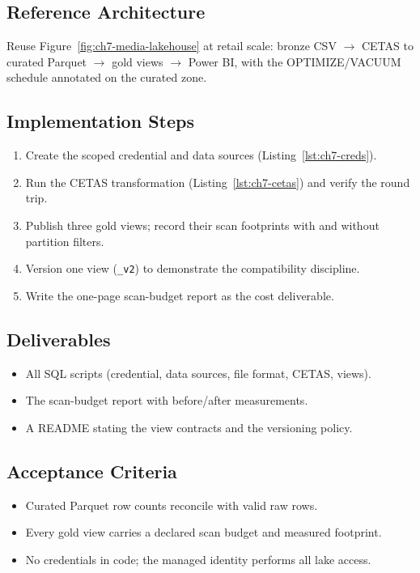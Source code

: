 \subsection*{Reference Architecture}
Reuse Figure~\ref{fig:ch7-media-lakehouse} at retail scale: bronze CSV $\rightarrow$ CETAS to curated Parquet $\rightarrow$ gold views $\rightarrow$ Power BI, with the OPTIMIZE/VACUUM schedule annotated on the curated zone.

\subsection*{Implementation Steps}
\begin{enumerate}
    \item Create the scoped credential and data sources (Listing~\ref{lst:ch7-creds}).
    \item Run the CETAS transformation (Listing~\ref{lst:ch7-cetas}) and verify the round trip.
    \item Publish three gold views; record their scan footprints with and without partition filters.
    \item Version one view (\texttt{\_v2}) to demonstrate the compatibility discipline.
    \item Write the one-page scan-budget report as the cost deliverable.
\end{enumerate}

\subsection*{Deliverables}
\begin{itemize}
    \item All SQL scripts (credential, data sources, file format, CETAS, views).
    \item The scan-budget report with before/after measurements.
    \item A README stating the view contracts and the versioning policy.
\end{itemize}

\subsection*{Acceptance Criteria}
\begin{itemize}
    \item Curated Parquet row counts reconcile with valid raw rows.
    \item Every gold view carries a declared scan budget and measured footprint.
    \item No credentials in code; the managed identity performs all lake access.
\end{itemize}

